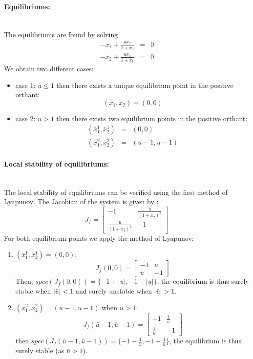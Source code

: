 \paragraph{Equilibriums:}~\\
The equilibriums are found by solving
$$
\begin{array}{rcl}
-x_1 +\frac{ux_2}{1+x_2} &=& 0\\
-x_2 +\frac{ux_1}{1+x_1} &=& 0
\end{array}
$$
We obtain two different cases:
\begin{itemize}
\item case 1: $\bar{u}\leq 1$ then there exists a unique equilibrium point in the positive orthant:
$$(\bar{x}_1,\bar{x}_2)=(0,0)$$
\item case 2: $\bar{u}>1$ then there exists two equilibrium points in the positive orthant:
$$
\begin{array}{rcl}
(\bar{x}^1_1,\bar{x}^1_2) &=& (0,0)\\
(\bar{x}^2_1,\bar{x}^2_2) &=& (\bar{u}-1,\bar{u}-1)
\end{array}
$$
\end{itemize}

\paragraph{Local stability of equilibriums:}~\\
The local stability of equilibriums can be verified using the first method of Lyapunov. The Jacobian of the system is given by :
$$
J_f=\begin{bmatrix}
-1 & \frac{u}{(1+x_2)^2}\\
\frac{u}{(1+x_1)^2} & -1
\end{bmatrix}
$$
For both equilibrium points we apply the method of Lyapunov:
\begin{enumerate}
\item $(\bar{x}^1_1,\bar{x}^1_2) = (0,0)$:
$$J_f(0,0) = \begin{bmatrix}
-1 & \bar{u}\\
\bar{u} & -1
\end{bmatrix} 
$$
Then, $spec(J_f(0,0))=\{-1+|\bar{u}|,-1-|\bar{u}|\}$, the equilibrium is thus surely stable when $|\bar{u}|<1$ and surely unstable when $|\bar{u}|>1$.
\item $(\bar{x}^2_1,\bar{x}^2_2) = (\bar{u}-1,\bar{u}-1)$ when $\bar{u}>1$:
$$J_f(\bar{u}-1,\bar{u}-1) = \begin{bmatrix}
-1 & \frac{1}{\bar{u}}\\
\frac{1}{\bar{u}} & -1
\end{bmatrix} 
$$
then $spec(J_f(\bar{u}-1,\bar{u}-1))=\{-1-\frac{1}{\bar{u}},-1+\frac{1}{\bar{u}}\}$, the equilibrium is thus surely stable (as $\bar{u}>1$).
\end{enumerate}

